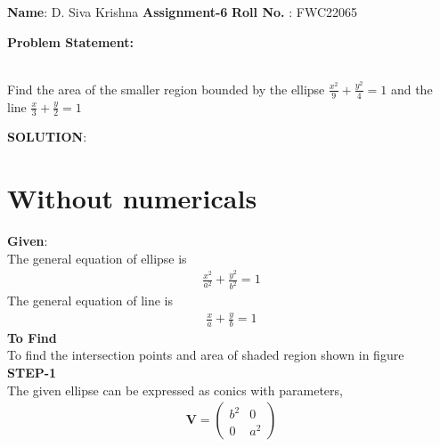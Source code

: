 \documentclass[10pt,a4paper]{report}
\newcommand{\myvec}[1]{\ensuremath{\begin{pmatrix}#1\end{pmatrix}}}
\let\vec\mathbf
\let\vec\mathbf
\begin{document}
\raggedright \textbf{Name}:\hspace{1mm} D. Siva Krishna\hspace{3cm} \Large \textbf{Assignment-6}\hspace{2.5cm} %
\normalsize \textbf{Roll No.} :\hspace{1mm} FWC22065\vspace{1cm}
\begin{multicols}{2}

\raggedright \textbf{Problem Statement:}\vspace{2mm}
\raggedright \\Find the area of the smaller region bounded by the ellipse $\frac{x^2}{9}+\frac{y^2}{4}=1$
and the line $\frac{x}{3}+\frac{y}{2}=1$\\
\vspace{5mm}
\raggedright \textbf{SOLUTION}:\vspace{2mm}\\
\section{Without numericals}
\raggedright \textbf{Given}:\vspace{2mm}\\
The general equation of ellipse is \\\vspace{1mm}
\begin{align}
\frac{x^2}{a^2}+\frac{y^2}{b^2}=1
\end{align}
The general equation of line is \\ \vspace{1mm}
\begin{align}
\frac{x}{a}+\frac{y}{b}=1
\end{align}
\textbf{To Find }\vspace{2mm}\\
To find the intersection points and area of shaded region shown in figure\vspace{2mm}  \\ 
\textbf{STEP-1}\vspace{2mm}\\
The given ellipse can be expressed as conics with parameters,\\ \vspace{1mm}
\begin{align}
\vec{V}=\myvec{
b^2 & 0\\
0 & a^2
}
\end{align}


\end{multicols}
\end{document}

